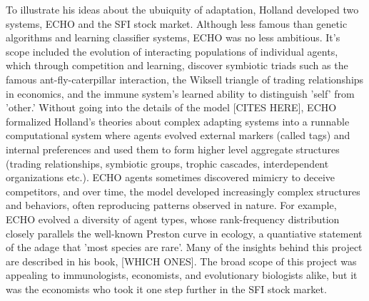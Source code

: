 To illustrate his ideas about the ubuiquity of adaptation, Holland developed two systems, ECHO and the SFI stock market.
Although less famous than genetic algorithms and learning classifier systems, ECHO was no less ambitious.  It's scope included the evolution of interacting populations of individual agents, which through competition and learning, discover symbiotic triads such as the famous ant-fly-caterpillar interaction,  the Wiksell triangle of trading relationships in economics, and the immune system's learned ability to distinguish 'self' from 'other.'  Without going into the details of the model [CITES HERE], ECHO formalized Holland's theories about complex adapting systems into a runnable computational system where agents evolved external markers (called tags) and internal preferences and used them to form higher level aggregate structures (trading relationships, symbiotic groups, trophic cascades, interdependent organizations etc.).  ECHO agents sometimes discovered mimicry to deceive competitors, and over time, the model developed increasingly complex structures and behaviors, often reproducing patterns observed in nature.  For example,  ECHO evolved a diversity of agent types, whose rank-frequency distribution closely parallels the well-known Preston curve in ecology, a quantiative statement of the adage that 'most species are rare'. Many of the insights behind this project are described in his book, [WHICH ONES]. The broad scope of this project was appealing to immunologists, economists, and evolutionary biologists alike, but it was the economists who took it one step further in the SFI stock market.


